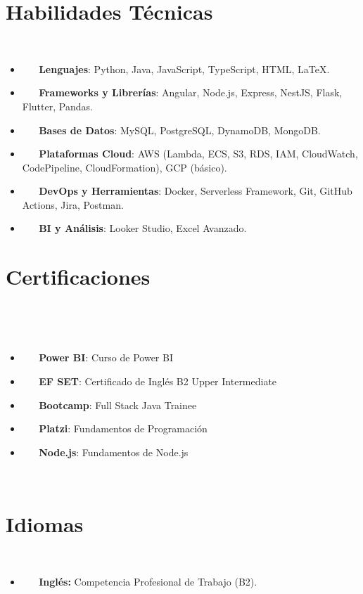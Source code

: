 \documentclass[letterpaper,11pt]{article}
\newcommand{\resumeItem}[2]{
  \item\small{
    \textbf{#1}{#2 \vspace{-2pt}}
  }
}
\newcommand{\resumeSubItem}[2]{\resumeItem{#1}{#2}\vspace{-4pt}}
\newcommand{\resumeSubItemcol}[2]{\resumeItem{#1}{#2}\vspace{-8pt}}
\newcommand{\resumeSubHeadingListStart}{\begin{itemize}[leftmargin=*]}
\newcommand{\resumeSubHeadingListEnd}{\end{itemize}}
\begin{document}
\section{Habilidades Técnicas}
 \resumeSubHeadingListStart
 \resumeSubItem{}{\textbf{Lenguajes}{: Python, Java, JavaScript, TypeScript, HTML, LaTeX.}}
 \resumeSubItem{}{\textbf{Frameworks y Librerías}{: Angular, Node.js, Express, NestJS, Flask, Flutter, Pandas.}}
 \resumeSubItem{}{\textbf{Bases de Datos}{: MySQL, PostgreSQL, DynamoDB, MongoDB.}}
 \resumeSubItem{}{\textbf{Plataformas Cloud}{: AWS (Lambda, ECS, S3, RDS, IAM, CloudWatch, CodePipeline, CloudFormation), GCP (básico).}}
 \resumeSubItem{}{\textbf{DevOps y Herramientas}{: Docker, Serverless Framework, Git, GitHub Actions, Jira, Postman.}}
 \resumeSubItem{}{\textbf{BI y Análisis}{: Looker Studio, Excel Avanzado.}}
 \resumeSubHeadingListEnd

\section{Certificaciones}
\vspace{-15pt}
  \begin{multicols}{2}
    \resumeSubHeadingListStart
    \resumeSubItemcol{Power BI}{: Curso de Power BI}
    \resumeSubItemcol{EF SET}{: Certificado de Inglés B2 Upper Intermediate}
    \resumeSubItemcol{Bootcamp}{: Full Stack Java Trainee}
    \resumeSubItemcol{Platzi}{: Fundamentos de Programación}
    \resumeSubItemcol{Node.js}{: Fundamentos de Node.js}
  \resumeSubHeadingListEnd
  \end{multicols}

\section{Idiomas}
 \resumeSubHeadingListStart
 \resumeSubItem{}{\textbf{Inglés:} Competencia Profesional de Trabajo (B2).}
 \resumeSubHeadingListEnd
\end{document}
